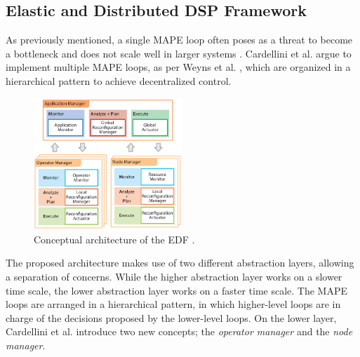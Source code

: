         \subsection{Elastic and Distributed DSP Framework}
        \label{sub:edf}
        As previously mentioned, a single MAPE loop often poses as a threat to become a bottleneck and does not scale well in larger systems \cite{cardellini}\cite{Cheng:2009:SES:1573856.1573858}.
        Cardellini et al. argue to implement multiple MAPE loops, as per Weyns et al. \cite{Weyns2013}, which are organized in a hierarchical pattern to achieve decentralized control.
        \begin{figure}[hbt]
            \centering
            \includegraphics[width=0.5\textwidth]{Bilder/hierarchical.png}
            \caption{
                    Conceptual architecture of the EDF \cite[p. 175]{cardellini}.
            }
            \label{fig:hierarchical}
        \end{figure}
        The proposed architecture makes use of two different abstraction layers, allowing a separation of concerns. 
        While the higher abstraction layer works on a slower time scale, the lower abstraction layer works on a faster time scale.
        The MAPE loops are arranged in a hierarchical pattern, in which higher-level loops are in charge of the decisions proposed by the lower-level loops.
        On the lower layer, Cardellini et al. introduce two new concepts; the \textit{operator manager} and the \textit{node manager}.

